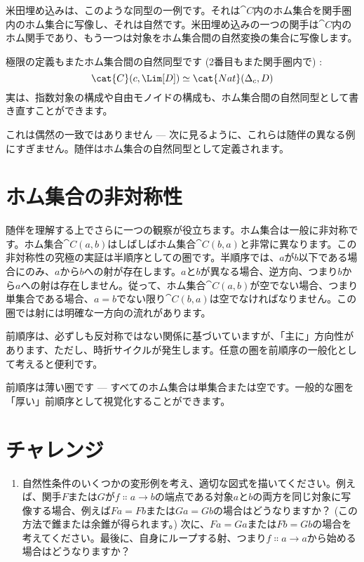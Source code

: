 米田埋め込みは、このような同型の一例です。それは$\cat{C}$内のホム集合を関手圏内のホム集合に写像し、それは自然です。米田埋め込みの一つの関手は$\cat{C}$内のホム関手であり、もう一つは対象をホム集合間の自然変換の集合に写像します。

極限の定義もまたホム集合間の自然同型です (2番目もまた関手圏内で) : 
\[\cat{C}(c, \Lim[D]) \simeq \cat{Nat}(\Delta_c, D)\]
実は、指数対象の構成や自由モノイドの構成も、ホム集合間の自然同型として書き直すことができます。

これは偶然の一致ではありません --- 次に見るように、これらは随伴の異なる例にすぎません。随伴はホム集合の自然同型として定義されます。

\section{ホム集合の非対称性}

随伴を理解する上でさらに一つの観察が役立ちます。ホム集合は一般に非対称です。ホム集合$\cat{C}(a, b)$はしばしばホム集合$\cat{C}(b, a)$と非常に異なります。この非対称性の究極の実証は半順序としての圏です。半順序では、$a$が$b$以下である場合にのみ、$a$から$b$への射が存在します。$a$と$b$が異なる場合、逆方向、つまり$b$から$a$への射は存在しません。従って、ホム集合$\cat{C}(a, b)$が空でない場合、つまり単集合である場合、$a = b$でない限り$\cat{C}(b, a)$は空でなければなりません。この圏では射には明確な一方向の流れがあります。

前順序は、必ずしも反対称ではない関係に基づいていますが、「主に」方向性があります、ただし、時折サイクルが発生します。任意の圏を前順序の一般化として考えると便利です。

前順序は薄い圏です --- すべてのホム集合は単集合または空です。一般的な圏を「厚い」前順序として視覚化することができます。

\section{チャレンジ}

\begin{enumerate}
  \tightlist
  \item
        自然性条件のいくつかの変形例を考え、適切な図式を描いてください。例えば、関手$F$または$G$が$f \Colon a \to b$の端点である対象$a$と$b$の両方を同じ対象に写像する場合、例えば$F a = F b$または$G a = G b$の場合はどうなりますか？ (この方法で錐または余錐が得られます。) 次に、$F a = G a$または$F b = G b$の場合を考えてください。最後に、自身にループする射、つまり$f \Colon a \to a$から始める場合はどうなりますか？
\end{enumerate}
